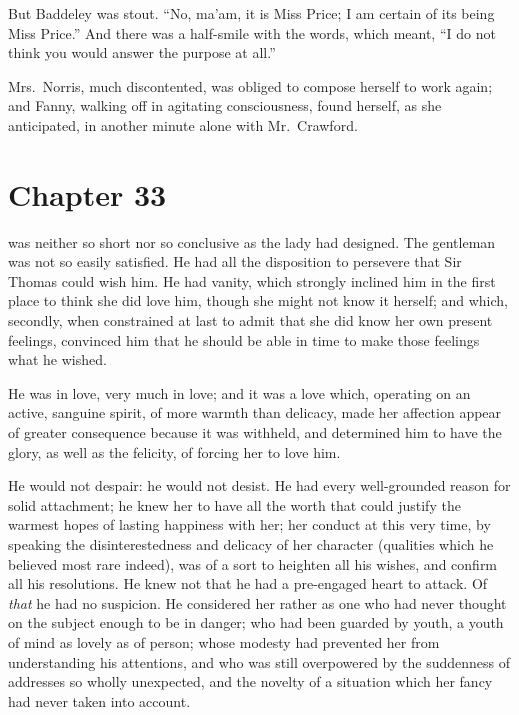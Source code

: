 But Baddeley was stout.  ``No, ma'am, it is Miss Price;
I am certain of its being Miss Price.''  And there was
a half-smile with the words, which meant, ``I do not think
you would answer the purpose at all.''

Mrs.\ Norris, much discontented, was obliged to compose
herself to work again; and Fanny, walking off in
agitating consciousness, found herself, as she anticipated,
in another minute alone with Mr.\ Crawford.



\chapter{Chapter 33}

 was neither so short nor so conclusive
as the lady had designed.  The gentleman was not
so easily satisfied.  He had all the disposition to
persevere that Sir Thomas could wish him.  He had vanity,
which strongly inclined him in the first place to think
she did love him, though she might not know it herself;
and which, secondly, when constrained at last to admit
that she did know her own present feelings, convinced him
that he should be able in time to make those feelings
what he wished.

He was in love, very much in love; and it was a love which,
operating on an active, sanguine spirit, of more warmth
than delicacy, made her affection appear of greater
consequence because it was withheld, and determined him
to have the glory, as well as the felicity, of forcing
her to love him.

He would not despair:  he would not desist.  He had every
well-grounded reason for solid attachment; he knew her
to have all the worth that could justify the warmest
hopes of lasting happiness with her; her conduct at this
very time, by speaking the disinterestedness and delicacy
of her character (qualities which he believed most rare
indeed), was of a sort to heighten all his wishes,
and confirm all his resolutions.  He knew not that he had a
pre-engaged heart to attack.  Of \emph{that} he had no suspicion.
He considered her rather as one who had never thought
on the subject enough to be in danger; who had been
guarded by youth, a youth of mind as lovely as of person;
whose modesty had prevented her from understanding
his attentions, and who was still overpowered by the
suddenness of addresses so wholly unexpected, and the novelty
of a situation which her fancy had never taken into account.

